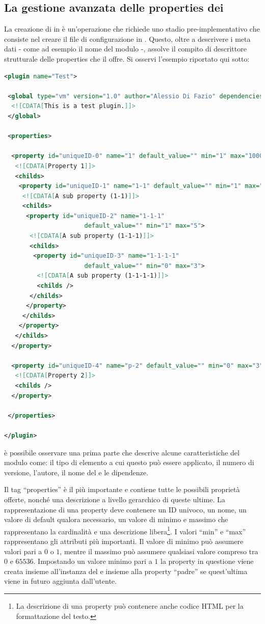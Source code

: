 \subsection{La gestione avanzata delle properties dei \plugin{}}
La creazione di \plugin{} in \visualnetkit{} è un'operazione che richiede uno stadio pre-implementativo che consiste nel creare il file di configurazione in \xml{}. Questo, oltre a descrivere i meta dati - come ad esempio il nome del modulo -, assolve il compito di descrittore strutturale delle properties che il \plugin{} offre.
Si osservi l'esempio riportato qui sotto:
\begin{lstlisting}[language=xml]
<plugin name="Test">
 
 <global type="vm" version="1.0" author="Alessio Di Fazio" dependencies="">
  <![CDATA[This is a test plugin.]]>
 </global>
 
 <properties>
  
  <property id="uniqueID-0" name="1" default_value="" min="1" max="1000">
   <![CDATA[Property 1]]>
   <childs>
    <property id="uniqueID-1" name="1-1" default_value="" min="1" max="2">
     <![CDATA[A sub property (1-1)]]>
     <childs>
      <property id="uniqueID-2" name="1-1-1"
                      default_value="" min="1" max="5">
       <![CDATA[A sub property (1-1-1)]]>
       <childs>
        <property id="uniqueID-3" name="1-1-1-1"
                      default_value="" min="0" max="3">
         <![CDATA[A sub property (1-1-1-1)]]>
         <childs />
       </childs>
      </property>
     </childs>
    </property> 
   </childs>
  </property>
  
  <property id="uniqueID-4" name="p-2" default_value="" min="0" max="3">
   <![CDATA[Property 2]]>
   <childs />
  </property>
  
 </properties>
 
</plugin>
\end{lstlisting}
è possibile osservare una prima parte che descrive alcune caratteristiche del modulo come: il tipo di elemento a cui questo può essere applicato, il numero di versione, l'autore, il nome del \plugin{} e le dipendenze.

Il tag ``properties'' è il più importante e contiene tutte le possibili proprietà offerte, nonché una descrizione a livello gerarchico di queste ultime. La rappresentazione di una property deve contenere un ID univoco, un nome, un valore di default qualora necessario, un valore di minimo e massimo che rappresentano la cardinalità e una descrizione libera\footnote{La descrizione di una property può contenere anche codice HTML per la formattazione del testo.}. I valori ``min'' e ``max'' rappresentano gli attributi più importanti. Il valore di minimo può assumere valori pari a $0$ o $1$, mentre il massimo può assumere qualsiasi valore compreso tra $0$ e $65536$. Impostando un valore minimo pari a $1$ la property in questione viene creata insieme all'instanza del \plugin{} e insieme alla property ``padre'' se quest'ultima viene in futuro aggiunta dall'utente.

